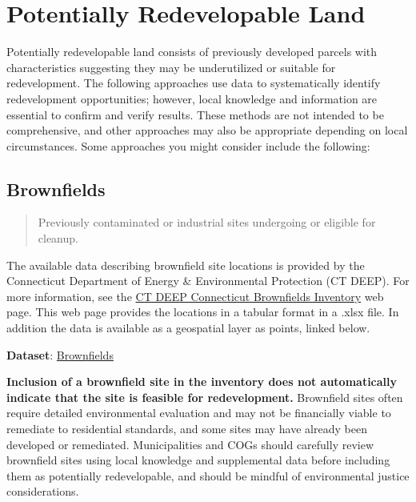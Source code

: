 \documentclass[
  letterpaper,
  DIV=11,
  numbers=noendperiod]{scrreprt}
\begin{document}
\section{Potentially Redevelopable
Land}\label{potentially-redevelopable-land}

Potentially redevelopable land consists of previously developed parcels
with characteristics suggesting they may be underutilized or suitable
for redevelopment. The following approaches use data to systematically
identify redevelopment opportunities; however, local knowledge and
information are essential to confirm and verify results. These methods
are not intended to be comprehensive, and other approaches may also be
appropriate depending on local circumstances. Some approaches you might
consider include the following:

\subsection{\texorpdfstring{\textbf{Brownfields}}{Brownfields}}\label{brownfields}

\begin{quote}
Previously contaminated or industrial sites undergoing or eligible for
cleanup.
\end{quote}

The available data describing brownfield site locations is provided by
the Connecticut Department of Energy \& Environmental Protection (CT
DEEP). For more information, see the
\href{https://portal.ct.gov/deep/remediation--site-clean-up/brownfields/brownfields-site-inventory}{CT
DEEP Connecticut Brownfields Inventory} web page. This web page provides
the locations in a tabular format in a .xlsx file. In addition the data
is available as a geospatial layer as points, linked below.

\textbf{Dataset}:
\href{https://housingmaps.ct.gov/datasets/CTDEEP::brownfields-2025/about}{Brownfields}

\textbf{Inclusion of a brownfield site in the inventory does not
automatically indicate that the site is feasible for redevelopment.}
Brownfield sites often require detailed environmental evaluation and may
not be financially viable to remediate to residential standards, and
some sites may have already been developed or remediated. Municipalities
and COGs should carefully review brownfield sites using local knowledge
and supplemental data before including them as potentially
redevelopable, and should be mindful of environmental justice
considerations.
\end{document}
